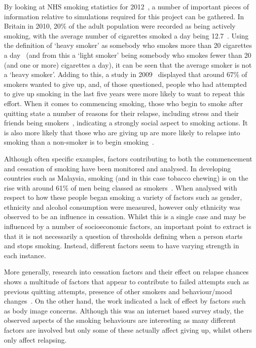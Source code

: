 \documentclass[]{report}
\begin{document}
By looking at NHS smoking statistics for 2012~\cite{NHS-13}, a number of important pieces of information relative to simulations required for this project can be gathered. In Britain in 2010, 20\% of the adult population were recorded as being actively smoking, with the average number of cigarettes smoked a day being 12.7~\cite{NHS-13}. Using the definition of `heavy smoker' as somebody who smokes more than 20 cigarettes a day~\cite{NHS-14} (and from this a `light smoker' being somebody who smokes fewer than 20 (and one or more) cigarettes a day), it can be seen that the average smoker is not a `heavy smoker'. Adding to this, a study in 2009~\cite{SmokBig} displayed that around 67\% of smokers wanted to give up, and, of those questioned, people who had attempted to give up smoking in the last five years were more likely to want to repeat this effort. When it comes to commencing smoking, those who begin to smoke after quitting state a number of reasons for their relapse, including stress and their friends being smokers~\cite{NHS-43}, indicating a strongly social aspect to smoking actions. It is also more likely that those who are giving up are more likely to relapse into smoking than a non-smoker is to begin smoking~\cite{NHS-43}.

Although often specific examples, factors contributing to both the commencement and cessation of smoking have been monitored and analysed. In developing countries such as Malaysia, smoking (and in this case tobacco chewing) is on the rise with around 61\% of men being classed as smokers~\cite{malay}. When analysed with respect to how these people began smoking a variety of factors such as gender, ethnicity and alcohol consumption were measured, however only ethnicity was observed to be an influence in cessation. Whilst this is a single case and may be influenced by a number of socioeconomic factors, an important point to extract is that it is not necessarily a question of thresholds defining when a person starts and stops smoking. Instead, different factors seem to have varying strength in each instance.

More generally, research into cessation factors and their effect on relapse chances shows a multitude of factors that appear to contribute to failed attempts such as previous quitting attempts, presence of other smokers and behaviour/mood changes~\cite{UCL-cess}. On the other hand, the work indicated a lack of effect by factors such as body image concerns. Although this was an internet based survey study, the observed aspects of the smoking behaviours are interesting as many different factors are involved but only some of these actually affect giving up, whilst others only affect relapsing.
\end{document}
